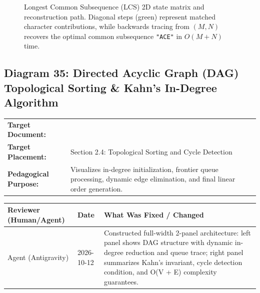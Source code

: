 \documentclass[11pt,a4paper]{article}
\newcommand{\breadcrumb}[3]{
    \par\vspace{0.15cm}
    \noindent\begin{tabularx}{\textwidth}{|l|X|}
    \hline
    \textbf{Target Document:} & \texttt{\detokenize{#1}} \\
    \textbf{Target Placement:} & #2 \\
    \textbf{Pedagogical Purpose:} & #3 \\
    \hline
    \end{tabularx}
    \vspace{0.15cm}\par
}
\newcommand{\diagramaudit}[3]{
    \par\vspace{0.12cm}
    \noindent\begin{tabularx}{\textwidth}{|l|l|>{\raggedright\arraybackslash}X|}
    \hline
    \textbf{Reviewer (Human/Agent)} & \textbf{Date} & \textbf{What Was Fixed / Changed} \\ \hline
    #1 & #2 & #3 \\ \hline
    \end{tabularx}
    \vspace{0.12cm}\par
}
\begin{document}
\begin{figure}[htbp]
{}
\caption{Longest Common Subsequence (LCS) 2D state matrix and reconstruction path. Diagonal steps (green) represent matched character contributions, while backwards tracing from $(M, N)$ recovers the optimal common subsequence \texttt{"ACE"} in $O(M + N)$ time.}
\end{figure}

\newpage
\newpage
\newpage

\subsection[Diagram 35: DAG Topological Sorting and Kahn's Algorithm]{Diagram 35: Directed Acyclic Graph (DAG) Topological Sorting \& Kahn's In-Degree Algorithm}

\breadcrumb{07.graph_algorithms.tex}{Section 2.4: Topological Sorting and Cycle Detection}{Visualizes in-degree initialization, frontier queue processing, dynamic edge elimination, and final linear order generation.}

\diagramaudit{Agent (Antigravity)}{2026-10-12}{Constructed full-width 2-panel architecture: left panel shows DAG structure with dynamic in-degree reduction and queue trace; right panel summarizes Kahn's invariant, cycle detection condition, and O(V + E) complexity guarantees.}
\end{document}
